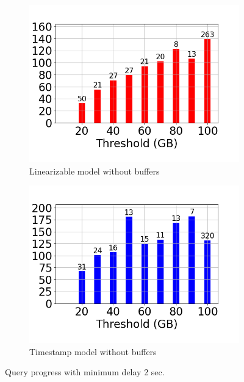 \begin{figure}
\begin{subfigure}[c]{0.48\textwidth}
	\end{subfigure}
	\begin{subfigure}[c]{0.48\textwidth}
		\includegraphics[width=1\textwidth]   {figures/Experiments/Dynamic/Progress/2/average_query_time_per_batch_version_999777016_10485760_10_delay[2].png}
		\caption{Linearizable model without buffers}
		\label{fig:progress-queries-2-logical-no-buffers}
	\end{subfigure}
	\begin{subfigure}[c]{0.48\textwidth}
		\includegraphics[width=1\textwidth]   {figures/Experiments/Dynamic/Progress/2/average_query_time_per_batch_version_999777017_10485760_10_delay[2].png}
		\caption{Timestamp model without buffers}
		\label{fig:progress-queries-2-system-no-buffers}
	\end{subfigure}
	\caption{Query progress with minimum delay 2 sec.}
	\label{fig:query-progress-delay-2}
\end{figure}

